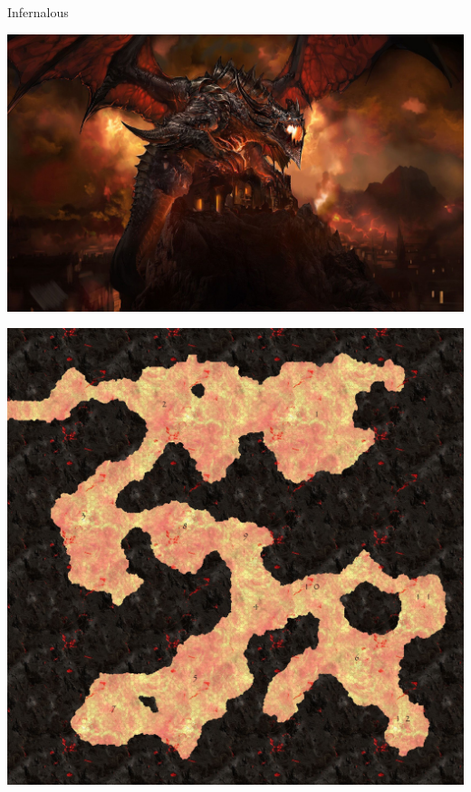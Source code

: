 \begin{commentbox}{Infernalous}
	\begin{center}
	\includegraphics[width=0.8\linewidth]{img/deathwing.jpg}
	
	\includegraphics[width=0.8\linewidth]{img/infernalous.jpg}
	\end{center}
\end{commentbox}

